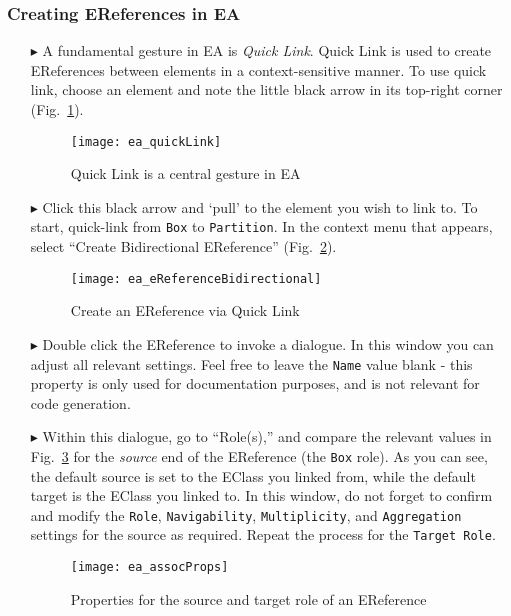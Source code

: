 \newpage
\subsubsection{Creating EReferences in EA}
\visHeader
\hypertarget{static:references vis}{}

\begin{itemize}

\item[$\blacktriangleright$] A fundamental gesture in EA is \emph{Quick Link}. Quick Link is used to create EReferences between elements in a context-sensitive
manner. To use quick link, choose an element and note the little black arrow in its top-right corner (Fig.~\ref{ea:quicklink}).

\begin{figure}[htbp]
	\centering
  \texttt{[image: ea\_quickLink]}
	\caption{Quick Link is a central gesture in EA}
	\label{ea:quicklink}
\end{figure}
\FloatBarrier

\item[$\blacktriangleright$] Click this black arrow and `pull' to the element you wish to link to. To start, quick-link from \texttt{Box} to \texttt{Partition}.
In the context menu that appears, select ``Create Bidirectional EReference'' (Fig.~\ref{ea:ereference}).

\begin{figure}[htbp]
	\centering
  \texttt{[image: ea\_eReferenceBidirectional]}
	\caption{Create an EReference via Quick Link}
	\label{ea:ereference}
\end{figure}
\FloatBarrier

\item[$\blacktriangleright$] Double click the EReference to invoke a dialogue. In this window you can adjust all relevant settings. Feel free to leave the
\texttt{Name} value blank - this property is only used for documentation purposes, and is not relevant for code generation.

\item[$\blacktriangleright$] Within this dialogue, go to ``Role(s),'' and compare the relevant values in Fig.~\ref{ea:roles} for the \emph{source} 
end of the EReference (the \texttt{Box} role). As you can see, the default source is set to the EClass you linked from, while the default target
is the EClass you linked to. In this window, do not forget to confirm and modify the \texttt{Role}, \texttt{Navigability}, \texttt{Multiplicity}, and
\texttt{Aggregation} settings for the source as required. Repeat the process for the \texttt{Target Role}.

\vspace{0.5cm}

\begin{figure}[htbp]
	\centering
    \texttt{[image: ea\_assocProps]}
	\caption{Properties for the source and target role of an EReference}
	\label{ea:roles}
\end{figure}

\end{itemize}


